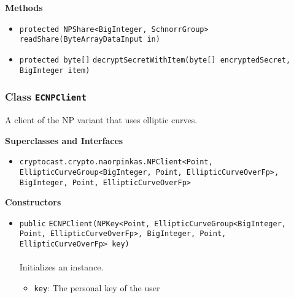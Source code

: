 \textbf{\sffamily Methods}
\begin{itemize}
\item \lstinline|protected NPShare<BigInteger, SchnorrGroup>| \lstinline|readShare|\lstinline|(ByteArrayDataInput in)| \\[-0.6em]




\item \lstinline|protected byte[]| \lstinline|decryptSecretWithItem|\lstinline|(byte[] encryptedSecret, BigInteger item)| \\[-0.6em]




\end{itemize}

\subsubsection{Class \lstinline|ECNPClient|}
A client of the NP variant that uses elliptic curves. \\
\noindent\begin{minipage}[t]{5cm}
\vspace{0.3em}
\hspace*{2em}
\vspace{0.3em}
\end{minipage}



\textbf{\sffamily Superclasses and Interfaces}
\begin{itemize}
\item \lstinline|cryptocast.crypto.naorpinkas.NPClient<Point, EllipticCurveGroup<BigInteger, Point, EllipticCurveOverFp>, BigInteger, Point, EllipticCurveOverFp>|
\end{itemize}


\textbf{\sffamily Constructors}
\begin{itemize}
\item \lstinline|public| \lstinline|ECNPClient|\lstinline|(NPKey<Point, EllipticCurveGroup<BigInteger, Point, EllipticCurveOverFp>, BigInteger, Point, EllipticCurveOverFp> key)|\\ \\[-0.6em]
Initializes an instance.
\begin{itemize}
\item \lstinline|key|: The personal key of the user
\end{itemize}



\end{itemize}



